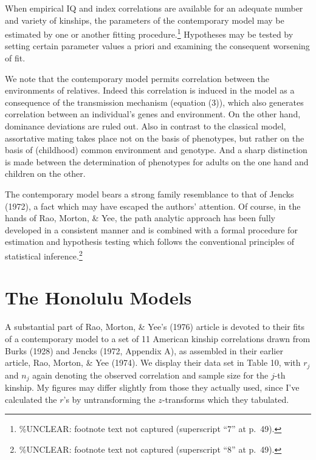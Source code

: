 ﻿\documentclass[12pt]{article}
\begin{document}
When empirical IQ and index correlations are available for an adequate number and variety of kinships, the parameters of the contemporary model may be estimated by one or another fitting procedure.\footnote{\%UNCLEAR: footnote text not captured (superscript ``7'' at p.\ 49).} Hypotheses may be tested by setting certain parameter values a priori and examining the consequent worsening of fit.

We note that the contemporary model permits correlation between the environments of relatives. Indeed this correlation is induced in the model as a consequence of the transmission mechanism (equation (3)), which also generates correlation between an individual's genes and environment. On the other hand, dominance deviations are ruled out. Also in contrast to the classical model, assortative mating takes place not on the basis of phenotypes, but rather on the basis of (childhood) common environment and genotype. And a sharp distinction is made between the determination of phenotypes for adults on the one hand and children on the other.

The contemporary model bears a strong family resemblance to that of Jencks (1972), a fact which may have escaped the authors' attention. Of course, in the hands of Rao, Morton, \& Yee, the path analytic approach has been fully developed in a consistent manner and is combined with a formal procedure for estimation and hypothesis testing which follows the conventional principles of statistical inference.\footnote{\%UNCLEAR: footnote text not captured (superscript ``8'' at p.\ 49).}

\section{The Honolulu Models}

A substantial part of Rao, Morton, \& Yee's (1976) article is devoted to their fits of a contemporary model to a set of 11 American kinship correlations drawn from Burks (1928) and Jencks (1972, Appendix A), as assembled in their earlier article, Rao, Morton, \& Yee (1974). We display their data set in Table 10, with $r_j$ and $n_j$ again denoting the observed correlation and sample size for the $j$-th kinship. My figures may differ slightly from those they actually used, since I've calculated the $r$'s by untransforming the $z$-transforms which they tabulated.
\end{document}
